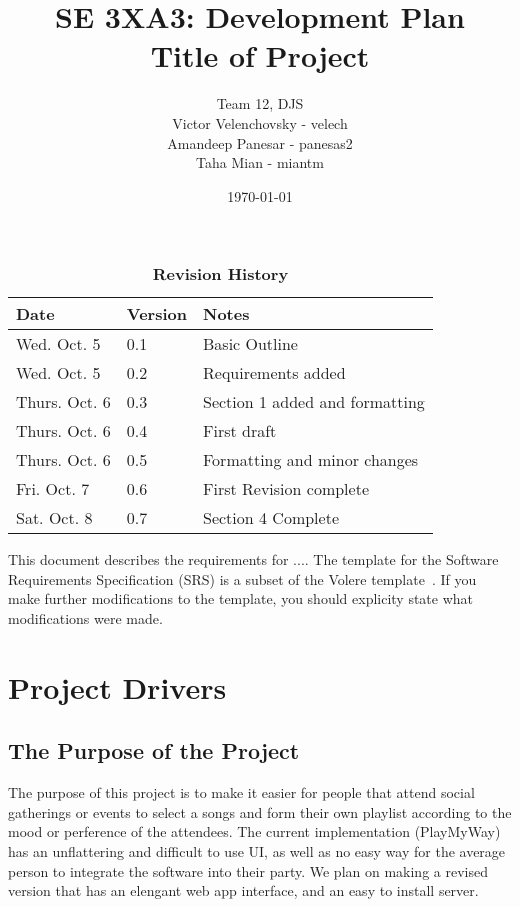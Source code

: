 \documentclass[12pt, titlepage]{article}
\title{SE 3XA3: Development Plan\\Title of Project}
\author{Team 12, DJS
	\\ Victor Velenchovsky - velech
	\\ Amandeep Panesar - panesas2
	\\ Taha Mian - miantm
}
\date{\today}
\begin{document}
\maketitle

\tableofcontents
\listoftables
\listoffigures

\begin{table}[bp]
\caption{\bf Revision History}
\begin{tabularx}{\textwidth}{p{3cm}p{2cm}X}
\toprule {\bf Date} & {\bf Version} & {\bf Notes}\\
\midrule
Wed. Oct. 5 & 0.1 & Basic Outline \\
Wed. Oct. 5 & 0.2 & Requirements added \\
Thurs. Oct. 6 & 0.3 & Section 1 added and formatting \\
Thurs. Oct. 6 & 0.4 & First draft \\
Thurs. Oct. 6 & 0.5 & Formatting and minor changes \\
Fri. Oct. 7 & 0.6 & First Revision complete \\
Sat. Oct. 8 & 0.7 & Section 4 Complete\\
\bottomrule
\end{tabularx}
\end{table}

\newpage


This document describes the requirements for ....  The template for the Software
Requirements Specification (SRS) is a subset of the Volere
template~\citep{RobertsonAndRobertson2012}.  If you make further modifications
to the template, you should explicity state what modifications were made.

\section{Project Drivers}

\subsection{The Purpose of the Project}
The purpose of this project is to make it easier for people that attend social
gatherings or events to select a songs and form their own playlist according to
the mood or perference of the attendees. The current implementation (PlayMyWay)
has an unflattering and difficult to use UI, as well as no easy way for the
average person to integrate the software into their party. We plan on making a
revised version that has an elengant web app interface, and an easy to install
server.
\end{document}
